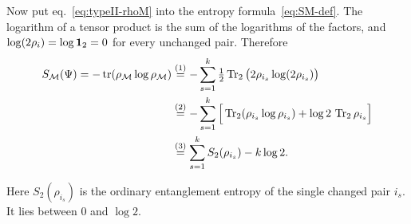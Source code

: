 Now put eq.~\eqref{eq:typeII-rhoM} into the entropy formula~\eqref{eq:SM-def}. The logarithm of a tensor
product is the sum of the logarithms of the factors, and $\log(2\rho_i)=\log\mathbf{1}_2=0$ for every unchanged pair.
Therefore
\begin{align}
S_{\mathcal{M}}(\Psi) = -\operatorname{tr}(\rho_{\mathcal{M}}\log\rho_{\mathcal{M}})
&\overset{(1)}{=} -\sum_{s=1}^k \tfrac12\operatorname{Tr}_2\big(2\rho_{i_s}\log(2\rho_{i_s})\big) \notag\\
&\overset{(2)}{=} -\sum_{s=1}^k \Big[\operatorname{Tr}_2(\rho_{i_s}\log\rho_{i_s}) + \log2\,\operatorname{Tr}_2\rho_{i_s}\Big] \notag\\
&\overset{(3)}{=} \sum_{s=1}^k S_2(\rho_{i_s}) - k\log2 .
\label{eq:typeII-entropy}
\end{align}
\quad
{}\quad
{}

Here $S_2(\rho_{i_s})$ is the ordinary entanglement entropy of the single changed pair $i_s$. It lies between
$0$ and $\log2$.

